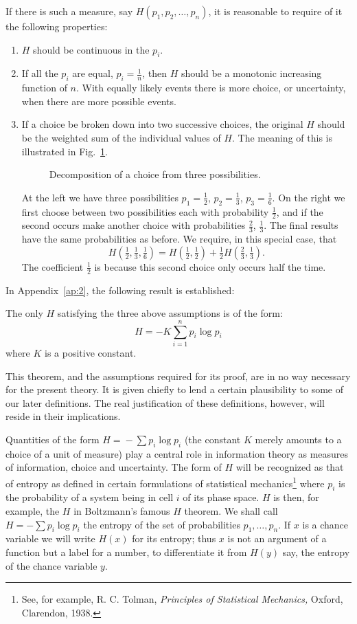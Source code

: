 If there is such a measure, say $H(p_1,p_2,\dots,p_n)$, it is reasonable
to require of it the following properties:
\begin{enumerate}
\item
\label{cond:1}
$H$ should be continuous in the $p_i$.
\item
\label{cond:2}
If all the $p_i$ are equal, $p_i = \frac1n$, then $H$ should be a
monotonic increasing function of $n$.  With equally likely events there
is more choice, or uncertainty, when there are more possible events.
\item
\label{cond:3}
If a choice be broken down into two successive choices, the original $H$
should be the weighted sum of the individual values of $H$.  The meaning
of this is illustrated in Fig.~\ref{fig:6}.
\begin{figure}[ht]
\centerline{}
\caption{Decomposition of a choice from three possibilities.}
\label{fig:6}
\end{figure}
At the left we have three possibilities $p_1 = \frac12$, $p_2
= \frac13$, $p_3 = \frac16$.  On the right we first choose
between two possibilities each with probability $\frac12$, and if
the second occurs make another choice with probabilities $\frac23$,
$\frac13$.  The final results have the same probabilities as before.
We require, in this special case, that
$$
H(\tfrac12,\tfrac13,\tfrac16)=H(\tfrac12,\tfrac12)
	+\tfrac12 H(\tfrac23,\tfrac13).
$$
The coefficient $\frac12$ is because
this second choice only occurs half the time.
\end{enumerate}

In Appendix~\ref{ap:2}, the following result is established:
\begin{theorem}
\label{thm:2}
The only $H$ satisfying the three above assumptions is of the form:
$$
H = - K \sum_{i=1}^n p_i \log p_i
$$
where $K$ is a positive constant.
\end{theorem}

This theorem, and the assumptions required for its proof, are in no way
necessary for the present theory.  It is given chiefly to lend a certain
plausibility to some of our later definitions.  The real justification
of these definitions, however, will reside in their implications.

Quantities of the form $H\! =\! -\! \sum p_i \log p_i$ (the constant $K$
merely amounts to a choice of a unit of measure) play a central role in
information theory as measures of information, choice and uncertainty.
The form of $H$ will be recognized as that of entropy as defined
in certain formulations of statistical mechanics\footnote{See, for
example, R. C. Tolman, {\it Principles of Statistical Mechanics,}
Oxford, Clarendon, 1938.} where $p_i$ is the probability of a system
being in cell $i$ of its phase space.  $H$ is then, for example, the $H$
in Boltzmann's famous $H$ theorem.  We shall call $H = - \sum p_i \log
p_i$ the entropy of the set of probabilities $p_1,\dots,p_n$.  If $x$
is a chance variable we will write $H(x)$ for its entropy; thus $x$ is
not an argument of a function but a label for a number, to differentiate
it from $H(y)$ say, the entropy of the chance variable $y$.

